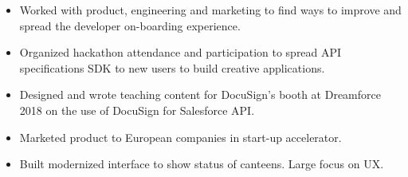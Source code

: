 \documentclass[10pt,a4paper,ragged2e]{altacv}
\begin{document}
\begin{itemize}
\item Worked with product, engineering and marketing to find ways to improve and spread the developer on-boarding experience.
\item Organized hackathon attendance and participation to spread API specifications SDK to new users to build creative applications.
\item Designed and wrote teaching content for DocuSign's booth at Dreamforce 2018 on the use of DocuSign for Salesforce API.
\end{itemize}
\divider

\begin{itemize}
\item Marketed product to European companies in start-up accelerator.
\item Built modernized interface to show status of canteens. Large focus on UX.
\end{itemize}
\begin{comment}
\cvsection{Projects}

\cvevent{Project 1}{Funding agency/institution}{}{}
\begin{itemize}
\item Details
\end{itemize}

\divider

\cvevent{Project 2}{Funding agency/institution}{Project duration}{}
A short abstract would also work.
\end{comment}

\medskip



\clearpage

\end{document}
